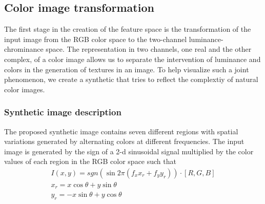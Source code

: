 \subsection{Color image transformation}
The first stage in the creation of the feature space is the transformation of the input image from the RGB color space to the two-channel luminance-chrominance space. The representation in two channels, one real and the other complex, of a color image allows us to separate the intervention of luminance and colors in the generation of textures in an image. To help visualize such a joint phenomenon, we create a synthetic that tries to reflect the complextiy of natural color images. 

\subsubsection{Synthetic image description}
The proposed synthetic image contains seven different regions with spatial variations generated by alternating colors at different frequencies. The input image is generated by the sign of a 2-d sinusoidal signal multiplied by the color values of each region in the RGB color space such that  
\begin{gather}
	I(x, y) = sgn( \sin 2 \pi (f_x x_r + f_y y_r)) \cdot [R, G, B]\label{eq:2D_squared_signal}\\
	x_r = x \cos\theta + y \sin\theta \nonumber \\
    y_r = -x \sin\theta + y \cos\theta \nonumber  
\end{gather}

